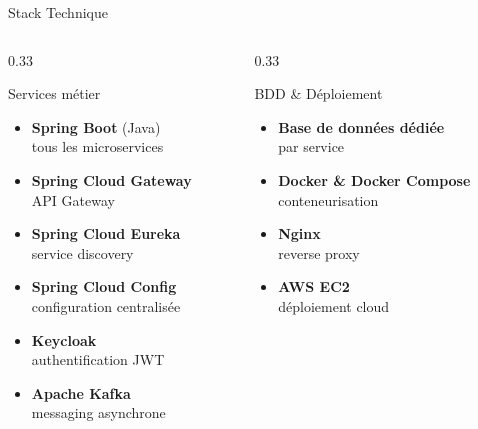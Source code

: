 \documentclass[aspectratio=169]{beamer}
\begin{document}
\begin{frame}{Stack Technique}

  \begin{columns}[T]

    \begin{column}{0.33\textwidth}
      \begin{block}{\faCode\quad Services métier}
        \begin{itemize}\small
          \item \textbf{Spring Boot} (Java)\\
                \scriptsize tous les microservices\normalsize
          \item \textbf{Spring Cloud Gateway}\\
                \scriptsize API Gateway\normalsize
          \item \textbf{Spring Cloud Eureka}\\
                \scriptsize service discovery\normalsize
          \item \textbf{Spring Cloud Config}\\
                \scriptsize configuration centralisée\normalsize
          \item \textbf{Keycloak}\\
                \scriptsize authentification JWT\normalsize
          \item \textbf{Apache Kafka}\\
                \scriptsize messaging asynchrone\normalsize
        \end{itemize}
      \end{block}
    \end{column}

    \begin{column}{0.33\textwidth}
      \begin{block}{\faDatabase\quad BDD \& Déploiement}
        \begin{itemize}\small
          \item \textbf{Base de données dédiée}\\
                \scriptsize par service\normalsize
          \item \textbf{Docker \& Docker Compose}\\
                \scriptsize conteneurisation\normalsize
          \item \textbf{Nginx}\\
                \scriptsize reverse proxy\normalsize
          \item \textbf{AWS EC2}\\
                \scriptsize déploiement cloud\normalsize
        \end{itemize}
      \end{block}
    \end{column}


\end{columns}
\end{frame}
\end{document}
